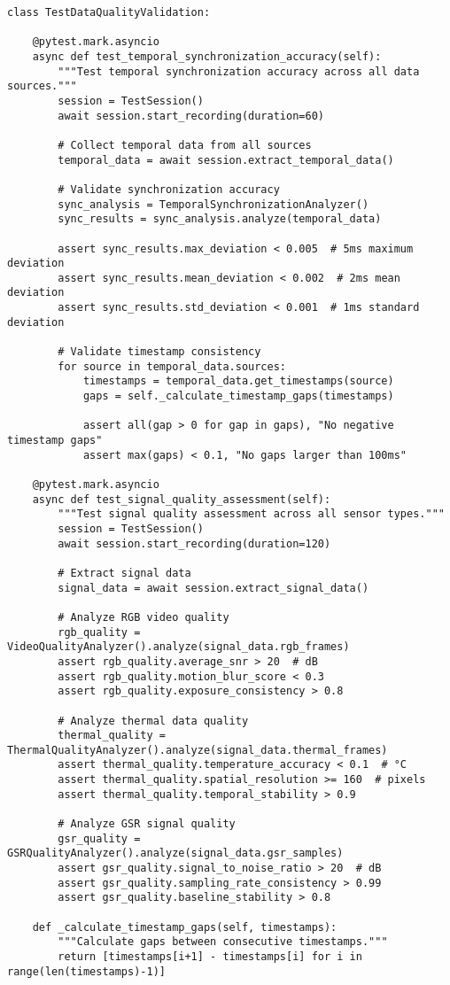 \documentclass[12pt,a4paper]{article}
\begin{document}
\begin{verbatim}
class TestDataQualityValidation:
    
    @pytest.mark.asyncio
    async def test_temporal_synchronization_accuracy(self):
        """Test temporal synchronization accuracy across all data sources."""
        session = TestSession()
        await session.start_recording(duration=60)
        
        # Collect temporal data from all sources
        temporal_data = await session.extract_temporal_data()
        
        # Validate synchronization accuracy
        sync_analysis = TemporalSynchronizationAnalyzer()
        sync_results = sync_analysis.analyze(temporal_data)
        
        assert sync_results.max_deviation < 0.005  # 5ms maximum deviation
        assert sync_results.mean_deviation < 0.002  # 2ms mean deviation
        assert sync_results.std_deviation < 0.001  # 1ms standard deviation
        
        # Validate timestamp consistency
        for source in temporal_data.sources:
            timestamps = temporal_data.get_timestamps(source)
            gaps = self._calculate_timestamp_gaps(timestamps)
            
            assert all(gap > 0 for gap in gaps), "No negative timestamp gaps"
            assert max(gaps) < 0.1, "No gaps larger than 100ms"
    
    @pytest.mark.asyncio
    async def test_signal_quality_assessment(self):
        """Test signal quality assessment across all sensor types."""
        session = TestSession()
        await session.start_recording(duration=120)
        
        # Extract signal data
        signal_data = await session.extract_signal_data()
        
        # Analyze RGB video quality
        rgb_quality = VideoQualityAnalyzer().analyze(signal_data.rgb_frames)
        assert rgb_quality.average_snr > 20  # dB
        assert rgb_quality.motion_blur_score < 0.3
        assert rgb_quality.exposure_consistency > 0.8
        
        # Analyze thermal data quality
        thermal_quality = ThermalQualityAnalyzer().analyze(signal_data.thermal_frames)
        assert thermal_quality.temperature_accuracy < 0.1  # °C
        assert thermal_quality.spatial_resolution >= 160  # pixels
        assert thermal_quality.temporal_stability > 0.9
        
        # Analyze GSR signal quality
        gsr_quality = GSRQualityAnalyzer().analyze(signal_data.gsr_samples)
        assert gsr_quality.signal_to_noise_ratio > 20  # dB
        assert gsr_quality.sampling_rate_consistency > 0.99
        assert gsr_quality.baseline_stability > 0.8
    
    def _calculate_timestamp_gaps(self, timestamps):
        """Calculate gaps between consecutive timestamps."""
        return [timestamps[i+1] - timestamps[i] for i in range(len(timestamps)-1)]
\end{verbatim}
\end{document}
